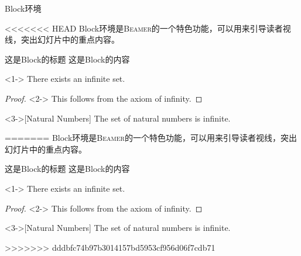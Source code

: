 \documentclass[aspectratio=169]{beamer}
\newcommand{\Beamer}{\textsc{Beamer}}
\begin{document}
\begin{frame}{Block环境}

<<<<<<< HEAD
	Block环境是\Beamer{}的一个特色功能，可以用来引导读者视线，突出幻灯片中的重点内容。

	\begin{block}{这是Block的标题}
		这是Block的内容
	\end{block}

	\begin{theorem}<1->
		There exists an infinite set.
	\end{theorem}

	\begin{proof}<2->
		This follows from the axiom of infinity.
	\end{proof}

	\begin{example}<3->[Natural Numbers]
		The set of natural numbers is infinite.
	\end{example}
=======
Block环境是\Beamer{}的一个特色功能，可以用来引导读者视线，突出幻灯片中的重点内容。

\begin{block}{这是Block的标题}
	这是Block的内容
\end{block}

\begin{theorem}<1->
There exists an infinite set.
\end{theorem}

\begin{proof}<2->
This follows from the axiom of infinity.
\end{proof}

\begin{example}<3->[Natural Numbers]
The set of natural numbers is infinite.
\end{example}
>>>>>>> dddbfc74b97b3014157bd5953cf956d06f7cdb71

\end{frame}
\end{document}
